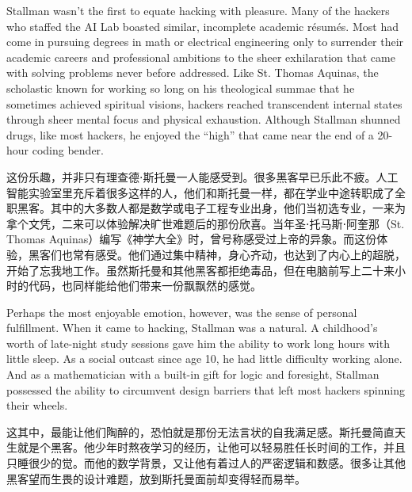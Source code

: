 \ifdefined\eng
Stallman wasn't the first to equate hacking with pleasure. Many of the hackers who staffed the AI Lab boasted similar, incomplete academic résumés. Most had come in pursuing degrees in math or electrical engineering only to surrender their academic careers and professional ambitions to the sheer exhilaration that came with solving problems never before addressed. Like St. Thomas Aquinas, the scholastic known for working so long on his theological summae that he sometimes achieved spiritual visions, hackers reached transcendent internal states through sheer mental focus and physical exhaustion. Although Stallman shunned drugs, like most hackers, he enjoyed the ``high'' that came near the end of a 20-hour coding bender.
\fi

\ifdefined\chs
这份乐趣，并非只有理查德⋅斯托曼一人能感受到。很多黑客早已乐此不疲。人工智能实验室里充斥着很多这样的人，他们和斯托曼一样，都在学业中途转职成了全职黑客。其中的大多数人都是数学或电子工程专业出身，他们当初选专业，一来为拿个文凭，二来可以体验解决旷世难题后的那份欣喜。当年圣⋅托马斯⋅阿奎那（St. Thomas Aquinas）编写《神学大全》时，曾号称感受过上帝的异象。而这份体验，黑客们也常有感受。他们通过集中精神，身心齐动，也达到了内心上的超脱，开始了忘我地工作。虽然斯托曼和其他黑客都拒绝毒品，但在电脑前写上二十来小时的代码，也同样能给他们带来一份飘飘然的感觉。
\fi

\ifdefined\eng
Perhaps the most enjoyable emotion, however, was the sense of personal fulfillment. When it came to hacking, Stallman was a natural. A childhood's worth of late-night study sessions gave him the ability to work long hours with little sleep. As a social outcast since age 10, he had little difficulty working alone. And as a mathematician with \ifdefined\vtwo a \fi built-in gift for logic and foresight, Stallman possessed the ability to circumvent design barriers that left most hackers spinning their wheels.
\fi

\ifdefined\chs
这其中，最能让他们陶醉的，恐怕就是那份无法言状的自我满足感。斯托曼简直天生就是个黑客。他少年时熬夜学习的经历，让他可以轻易胜任长时间的工作，并且只睡很少的觉。而他的数学背景，又让他有着过人的严密逻辑和数感。很多让其他黑客望而生畏的设计难题，放到斯托曼面前却变得轻而易举。
\fi

